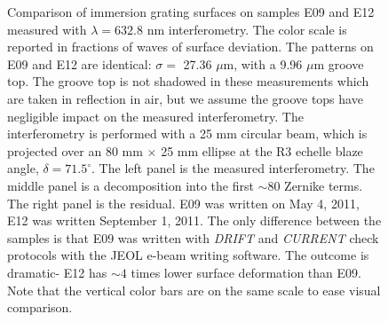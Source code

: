 \documentclass[]{spie}  %
\begin{document}
\begin{figure}
   \newline
  \caption{Comparison of immersion grating surfaces on samples E09 and E12 measured with $\lambda = 632.8 $ nm interferometry.  The color scale is reported in fractions of waves of surface deviation.  The patterns on E09 and E12 are identical: $\sigma = $ 27.36 $\mu$m, with a 9.96 $\mu$m groove top.  The groove top is not shadowed in these measurements which are taken in reflection in air, but we assume the groove tops have negligible impact on the measured interferometry.  The interferometry is performed with a 25 mm circular beam, which is projected over an 80 mm $\times$ 25 mm ellipse at the R3 echelle blaze angle, $\delta = 71.5 ^\circ$.  The left panel is the measured interferometry.  The middle panel is a decomposition into the first $\sim 80$ Zernike terms.  The right panel is the residual.  E09 was written on May 4, 2011, E12 was written September 1, 2011.  The only difference between the samples is that E09 was written with \emph{DRIFT} and \emph{CURRENT} check protocols with the JEOL e-beam writing software.  The outcome is dramatic- E12 has $\sim 4$ times lower surface deformation than E09.  Note that the vertical color bars are on the same scale to ease visual comparison.}
  \label{fig:igrams}
\end{figure}
\end{document}
